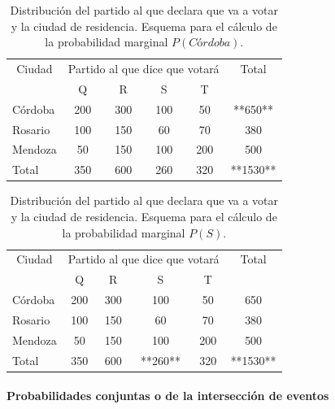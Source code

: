 \documentclass[]{article}
\let\oldparagraph\paragraph
\renewcommand{\paragraph}[1]{\oldparagraph{#1}\mbox{}}
\begin{document}
\begin{table}

\caption{\label{tab:unnamed-chunk-16}Distribución del partido al que declara que va a votar y la ciudad de residencia. Esquema para el cálculo de la probabilidad marginal $P(Córdoba)$.}
\centering
\begin{tabular}[t]{lccccc}
\toprule
\multicolumn{1}{c}{Ciudad} & \multicolumn{4}{c}{Partido al que dice que votará} & \multicolumn{1}{c}{Total} \\
\cmidrule(l{3pt}r{3pt}){1-1} \cmidrule(l{3pt}r{3pt}){2-5} \cmidrule(l{3pt}r{3pt}){6-6}
 & Q & R & S & T & \\
\midrule
\rowcolor{gray!6}  Córdoba & 200 & 300 & 100 & 50 & **650**\\
Rosario & 100 & 150 & 60 & 70 & 380\\
\rowcolor{gray!6}  Mendoza & 50 & 150 & 100 & 200 & 500\\
Total & 350 & 600 & 260 & 320 & **1530**\\
\bottomrule
\end{tabular}
\end{table}

\begin{table}

\caption{\label{tab:unnamed-chunk-17}Distribución del partido al que declara que va a votar y la ciudad de residencia. Esquema para el cálculo de la probabilidad marginal $P(S)$.}
\centering
\begin{tabular}[t]{lccccc}
\toprule
\multicolumn{1}{c}{Ciudad} & \multicolumn{4}{c}{Partido al que dice que votará} & \multicolumn{1}{c}{Total} \\
\cmidrule(l{3pt}r{3pt}){1-1} \cmidrule(l{3pt}r{3pt}){2-5} \cmidrule(l{3pt}r{3pt}){6-6}
 & Q & R & S & T & \\
\midrule
\rowcolor{gray!6}  Córdoba & 200 & 300 & 100 & 50 & 650\\
Rosario & 100 & 150 & 60 & 70 & 380\\
\rowcolor{gray!6}  Mendoza & 50 & 150 & 100 & 200 & 500\\
Total & 350 & 600 & **260** & 320 & **1530**\\
\bottomrule
\end{tabular}
\end{table}

\hypertarget{probabilidades-conjuntas-o-de-la-intersecciuxf3n-de-eventos}{%
\paragraph{Probabilidades conjuntas o de la intersección de
eventos}\label{probabilidades-conjuntas-o-de-la-intersecciuxf3n-de-eventos}}
\end{document}
